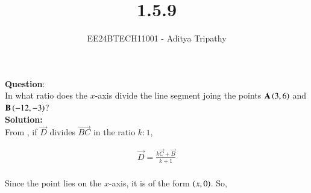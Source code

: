 \documentclass[journal]{IEEEtran}
\begin{document}

\vspace{3cm}

\title{1.5.9}
\author{EE24BTECH11001 - Aditya Tripathy}
{\let\newpage\relax\maketitle}

\renewcommand{\thefigure}{\theenumi}
\renewcommand{\thetable}{\theenumi}
\setlength{\intextsep}{10pt} %


\renewcommand{\thetable}{\theenumi}


\textbf{Question}:\\
In what ratio does the $x$-axis divide the line segment joing the points $\mathbf{A} \left(3,6\right)$ and $\mathbf{B}\left(-12,-3\right)$?
\\
\textbf{Solution: }\\
From , if $\vec{D}$ divides $\vec{BC}$ in the ratio $k:1$,

\begin{align}
	\vec{D} = \frac{k\vec{C} + \vec{B}}{k+1}
\end{align}
 \\
Since the point lies on the $x$-axis, it is of the form $\left(x,0\right)$. So, 
\end{document}
